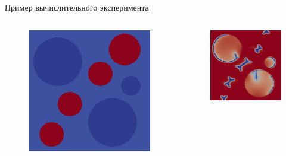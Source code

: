 \begin{frame}{Пример вычислительного эксперимента}
\begin{columns}
\begin{figure}
	\includegraphics[width=\textwidth]{figures/model_example_1.png}
\end{figure}
\begin{figure}
	\includegraphics[width=\textwidth]{figures/model_example_2.png}

\end{figure}
\end{columns}
\end{frame}
